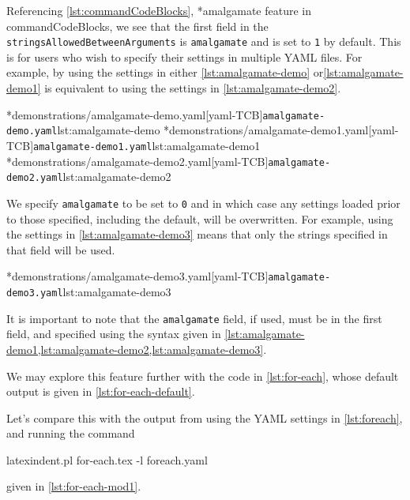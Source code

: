	Referencing \vref{lst:commandCodeBlocks},%
	*{amalgamate feature in commandCodeBlocks}, we see that the first
	field in the \texttt{stringsAllowedBetweenArguments} is \texttt{amalgamate} and is set to
	\texttt{1} by default. This is for users who wish to specify their settings in multiple
	YAML files. For example, by using the settings in either \cref{lst:amalgamate-demo}
	or\cref{lst:amalgamate-demo1} is equivalent to using the settings in
	\cref{lst:amalgamate-demo2}.

	\begin{cmhtcbraster}[raster columns=3,
			raster left skip=-3.5cm,
			raster right skip=-2cm,
			raster column skip=.03\linewidth]
		\cmhlistingsfromfile[style=yaml-LST]*{demonstrations/amalgamate-demo.yaml}[yaml-TCB]{\texttt{amalgamate-demo.yaml}}{lst:amalgamate-demo}
		\cmhlistingsfromfile[style=yaml-LST]*{demonstrations/amalgamate-demo1.yaml}[yaml-TCB]{\texttt{amalgamate-demo1.yaml}}{lst:amalgamate-demo1}
		\cmhlistingsfromfile[style=yaml-LST]*{demonstrations/amalgamate-demo2.yaml}[yaml-TCB]{\texttt{amalgamate-demo2.yaml}}{lst:amalgamate-demo2}
	\end{cmhtcbraster}

	We specify \texttt{amalgamate} to be set to \texttt{0} and in which case any settings
	loaded prior to those specified, including the default, will be overwritten. For example,
	using the settings in \cref{lst:amalgamate-demo3} means that only the strings specified
	in that field will be used.

	\cmhlistingsfromfile[style=yaml-LST]*{demonstrations/amalgamate-demo3.yaml}[yaml-TCB]{\texttt{amalgamate-demo3.yaml}}{lst:amalgamate-demo3}

	It is important to note that the \texttt{amalgamate} field, if used, must be in the first
	field, and specified using the syntax given in
	\cref{lst:amalgamate-demo1,lst:amalgamate-demo2,lst:amalgamate-demo3}.

	We may explore this feature further with the code in \cref{lst:for-each}, whose default
	output is given in \cref{lst:for-each-default}.

	\begin{cmhtcbraster}[raster column skip=.1\linewidth]
	\end{cmhtcbraster}

	Let's compare this with the output from using the YAML settings in \cref{lst:foreach},
	and running the command
	\begin{commandshell}
latexindent.pl for-each.tex -l foreach.yaml  
\end{commandshell}
	given in \cref{lst:for-each-mod1}.

